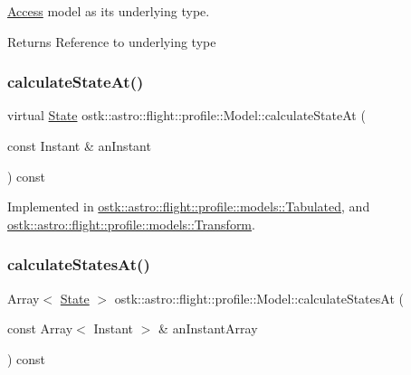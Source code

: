 \hyperlink{classostk_1_1astro_1_1_access}{Access} model as its underlying type. 

\begin{DoxyReturn}{Returns}
Reference to underlying type 
\end{DoxyReturn}
\mbox{\label{classostk_1_1astro_1_1flight_1_1profile_1_1_model_a1b205fa29b50fcfc06c99234a8579eb8}} 
\subsubsection{\texorpdfstring{calculate\+State\+At()}{calculateStateAt()}}
{\footnotesize\ttfamily virtual \hyperlink{classostk_1_1astro_1_1flight_1_1profile_1_1_state}{State} ostk\+::astro\+::flight\+::profile\+::\+Model\+::calculate\+State\+At (\begin{DoxyParamCaption}\item[{const Instant \&}]{an\+Instant }\end{DoxyParamCaption}) const\hspace{0.3cm}{\ttfamily [pure virtual]}}



Implemented in \hyperlink{classostk_1_1astro_1_1flight_1_1profile_1_1models_1_1_tabulated_af27ea0e7006d0de18e897a9a5c7a0fb2}{ostk\+::astro\+::flight\+::profile\+::models\+::\+Tabulated}, and \hyperlink{classostk_1_1astro_1_1flight_1_1profile_1_1models_1_1_transform_a6288febae942c92508173db08b4554b0}{ostk\+::astro\+::flight\+::profile\+::models\+::\+Transform}.

\mbox{\label{classostk_1_1astro_1_1flight_1_1profile_1_1_model_ab81349e148cc39ad5662f7181f146493}} 
\subsubsection{\texorpdfstring{calculate\+States\+At()}{calculateStatesAt()}}
{\footnotesize\ttfamily Array$<$ \hyperlink{classostk_1_1astro_1_1flight_1_1profile_1_1_state}{State} $>$ ostk\+::astro\+::flight\+::profile\+::\+Model\+::calculate\+States\+At (\begin{DoxyParamCaption}\item[{const Array$<$ Instant $>$ \&}]{an\+Instant\+Array }\end{DoxyParamCaption}) const\hspace{0.3cm}{\ttfamily [virtual]}}

